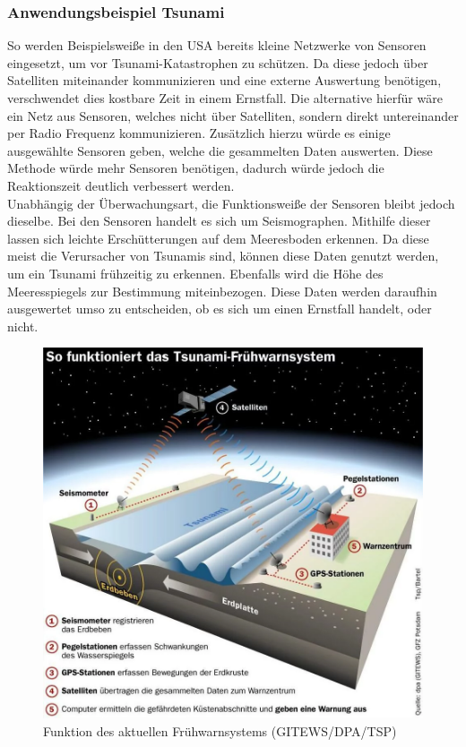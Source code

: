 \documentclass[a4paper,12pt]{scrartcl}
\begin{document}
\subsubsection{Anwendungsbeispiel Tsunami}
So werden Beispielsweiße in den USA bereits kleine Netzwerke von Sensoren eingesetzt, um vor Tsunami-Katastrophen zu schützen. Da diese jedoch über Satelliten miteinander kommunizieren und eine externe Auswertung benötigen, verschwendet dies kostbare Zeit in einem Ernstfall. Die alternative hierfür wäre ein Netz aus Sensoren, welches nicht über Satelliten, sondern direkt untereinander per Radio Frequenz kommunizieren. Zusätzlich hierzu würde es einige ausgewählte Sensoren geben, welche die gesammelten Daten auswerten. Diese Methode würde mehr Sensoren benötigen, dadurch würde jedoch die Reaktionszeit deutlich verbessert werden. \cite{A Sensor Network Architecture for Tsunami Detection and Response, Seite 3 ff.}\\
Unabhängig der Überwachungsart, die Funktionsweiße der Sensoren bleibt jedoch dieselbe. Bei den Sensoren handelt es sich um Seismographen. Mithilfe dieser lassen sich leichte Erschütterungen auf dem Meeresboden erkennen. Da diese meist die Verursacher von Tsunamis sind, können diese Daten genutzt werden, um ein Tsunami frühzeitig zu erkennen. Ebenfalls wird die Höhe des Meeresspiegels zur Bestimmung miteinbezogen. Diese Daten werden daraufhin ausgewertet umso zu entscheiden, ob es sich um einen Ernstfall handelt, oder nicht. 
\cite{A Sensor Network Architecture for Tsunami Detection and Response, Seite 3 ff.}\\

\begin{figure}[H]
\centering
\includegraphics[scale=0.6]{picture/tsunami}
\caption{Funktion des aktuellen Frühwarnsystems (GITEWS/DPA/TSP)}
\label{fig:Funktion des aktuellen Fruehwarnsystems}
\end{figure}
\end{document}
